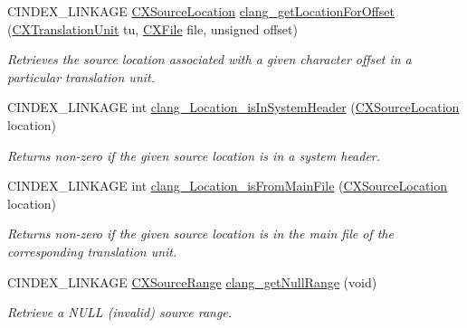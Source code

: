 \begin{DoxyCompactItemize}
C\+I\+N\+D\+E\+X\+\_\+\+L\+I\+N\+K\+A\+GE \mbox{\hyperlink{structCXSourceLocation}{C\+X\+Source\+Location}} \mbox{\hyperlink{group__CINDEX__LOCATIONS_gab6f5b1cc0761131ccfd1dc8cdca1f6d8}{clang\+\_\+get\+Location\+For\+Offset}} (\mbox{\hyperlink{group__CINDEX_gacdb7815736ca709ce9a5e1ec2b7e16ac}{C\+X\+Translation\+Unit}} tu, \mbox{\hyperlink{group__CINDEX__FILES_gacfcea9c1239c916597e2e5b3e109215a}{C\+X\+File}} file, unsigned offset)
\begin{DoxyCompactList}\small\item\em Retrieves the source location associated with a given character offset in a particular translation unit. \end{DoxyCompactList}\item 
\mbox{\label{group__CINDEX__LOCATIONS_ga6bff8dbc149f24f388d8b960e99222a1}} 
C\+I\+N\+D\+E\+X\+\_\+\+L\+I\+N\+K\+A\+GE int \mbox{\hyperlink{group__CINDEX__LOCATIONS_ga6bff8dbc149f24f388d8b960e99222a1}{clang\+\_\+\+Location\+\_\+is\+In\+System\+Header}} (\mbox{\hyperlink{structCXSourceLocation}{C\+X\+Source\+Location}} location)
\begin{DoxyCompactList}\small\item\em Returns non-\/zero if the given source location is in a system header. \end{DoxyCompactList}\item 
\mbox{\label{group__CINDEX__LOCATIONS_gacb4ca7b858d66f0205797ae84cc4e8f2}} 
C\+I\+N\+D\+E\+X\+\_\+\+L\+I\+N\+K\+A\+GE int \mbox{\hyperlink{group__CINDEX__LOCATIONS_gacb4ca7b858d66f0205797ae84cc4e8f2}{clang\+\_\+\+Location\+\_\+is\+From\+Main\+File}} (\mbox{\hyperlink{structCXSourceLocation}{C\+X\+Source\+Location}} location)
\begin{DoxyCompactList}\small\item\em Returns non-\/zero if the given source location is in the main file of the corresponding translation unit. \end{DoxyCompactList}\item 
\mbox{\label{group__CINDEX__LOCATIONS_gafcb849f2f038466f46397d552e736da3}} 
C\+I\+N\+D\+E\+X\+\_\+\+L\+I\+N\+K\+A\+GE \mbox{\hyperlink{structCXSourceRange}{C\+X\+Source\+Range}} \mbox{\hyperlink{group__CINDEX__LOCATIONS_gafcb849f2f038466f46397d552e736da3}{clang\+\_\+get\+Null\+Range}} (void)
\begin{DoxyCompactList}\small\item\em Retrieve a N\+U\+LL (invalid) source range. \end{DoxyCompactList}\item 

\end{DoxyCompactItemize}
